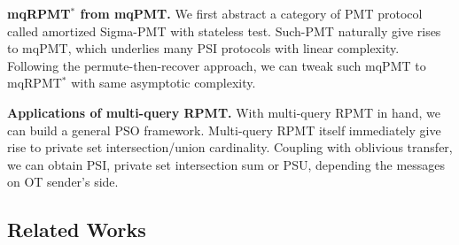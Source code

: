 \documentclass[a4paper,10pt]{article}
\begin{document}
\begin{trivlist}
\item \textbf{mqRPMT$^*$ from mqPMT.} We first abstract a category of PMT protocol called amortized Sigma-PMT 
    with stateless test. Such-PMT naturally give rises to mqPMT, which underlies many PSI protocols with linear complexity. 
    Following the permute-then-recover approach, we can tweak such mqPMT to mqRPMT$^*$ with same asymptotic complexity.  

\item \textbf{Applications of multi-query RPMT.} With multi-query RPMT in hand, we can build a general PSO framework. 
    Multi-query RPMT itself immediately give rise to private set intersection/union cardinality. 
    Coupling with oblivious transfer, we can obtain PSI, private set intersection sum or PSU, 
    depending the messages on OT sender's side. 
\end{trivlist}

\subsection{Related Works}




 

\end{document}
